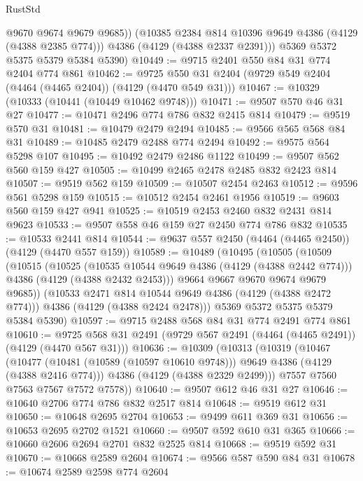 \begin{lexlean}{RustStd}
\begin{coremodule}
            @9670
            @9674
            @9679
            @9685))
        (@10385 @2384 @814 @10396 @9649 @4386 (@4129 (@4388 @2385 @774)))
        @4386
        (@4129 (@4388 @2337 @2391)))
      @5369
      @5372
      @5375
      @5379
      @5384
      @5390)
@10449 := @9715 @2401 @550 @84 @31 @774 @2404 @774 @861
@10462 := @9725 @550 @31 @2404 (@9729 @549 @2404 (@4464 (@4465 @2404)) (@4129 (@4470 @549 @31)))
@10467 := @10329 (@10333 (@10441 (@10449 @10462 @9748)))
@10471 := @9507 @570 @46 @31 @27
@10477 := @10471 @2496 @774 @786 @832 @2415 @814
@10479 := @9519 @570 @31
@10481 := @10479 @2479 @2494
@10485 := @9566 @565 @568 @84 @31
@10489 := @10485 @2479 @2488 @774 @2494
@10492 := @9575 @564 @5298 @107
@10495 := @10492 @2479 @2486 @1122
@10499 := @9507 @562 @560 @159 @427
@10505 := @10499 @2465 @2478 @2485 @832 @2423 @814
@10507 := @9519 @562 @159
@10509 := @10507 @2454 @2463
@10512 := @9596 @561 @5298 @159
@10515 := @10512 @2454 @2461 @1956
@10519 := @9603 @560 @159 @427 @941
@10525 := @10519 @2453 @2460 @832 @2431 @814 @9623
@10533 := @9507 @558 @46 @159 @27 @2450 @774 @786 @832
@10535 := @10533 @2441 @814
@10544 := @9637 @557 @2450 (@4464 (@4465 @2450)) (@4129 (@4470 @557 @159))
@10589 := @10489
    (@10495
      (@10505
        (@10509
          (@10515
            (@10525
              (@10535 @10544 @9649 @4386 (@4129 (@4388 @2442 @774)))
              @4386
              (@4129 (@4388 @2432 @2453)))
            @9664
            @9667
            @9670
            @9674
            @9679
            @9685))
        (@10533 @2471 @814 @10544 @9649 @4386 (@4129 (@4388 @2472 @774)))
        @4386
        (@4129 (@4388 @2424 @2478)))
      @5369
      @5372
      @5375
      @5379
      @5384
      @5390)
@10597 := @9715 @2488 @568 @84 @31 @774 @2491 @774 @861
@10610 := @9725 @568 @31 @2491 (@9729 @567 @2491 (@4464 (@4465 @2491)) (@4129 (@4470 @567 @31)))
@10636 := @10309
    (@10313
      (@10319
        (@10467
          (@10477 (@10481 (@10589 (@10597 @10610 @9748))) @9649 @4386 (@4129 (@4388 @2416 @774)))
          @4386
          (@4129 (@4388 @2329 @2499)))
        @7557
        @7560
        @7563
        @7567
        @7572
        @7578))
@10640 := @9507 @612 @46 @31 @27
@10646 := @10640 @2706 @774 @786 @832 @2517 @814
@10648 := @9519 @612 @31
@10650 := @10648 @2695 @2704
@10653 := @9499 @611 @369 @31
@10656 := @10653 @2695 @2702 @1521
@10660 := @9507 @592 @610 @31 @365
@10666 := @10660 @2606 @2694 @2701 @832 @2525 @814
@10668 := @9519 @592 @31
@10670 := @10668 @2589 @2604
@10674 := @9566 @587 @590 @84 @31
@10678 := @10674 @2589 @2598 @774 @2604

\end{coremodule}
\end{lexlean}
